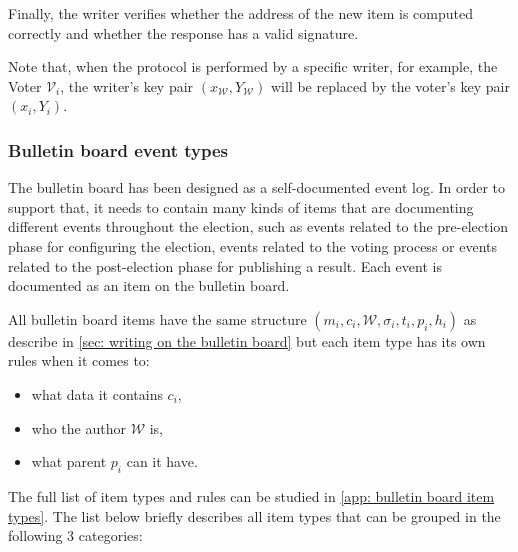 Finally, the writer verifies whether the address of the new item is computed correctly and whether the response has a valid signature.

Note that, when the protocol is performed by a specific writer, for example, the Voter $\mathcal{V}_i$, the writer's key pair $(x_\mathcal{W}, Y_\mathcal{W})$ will be replaced by the voter's key pair $(x_i, Y_i)$.


\subsubsection{Bulletin board event types} \label{sec: bulletin board event types}
The bulletin board has been designed as a self-documented event log. In order to support that, it needs to contain many kinds of items that are documenting different events throughout the election, such as events related to the pre-election phase for configuring the election, events related to the voting process or events related to the post-election phase for publishing a result. Each event is documented as an item on the bulletin board.

All bulletin board items have the same structure $(m_i, c_i, \mathcal{W}, \sigma_i, t_i, p_i, h_i)$ as describe in \cref{sec: writing on the bulletin board} but each item type has its own rules when it comes to:
\begin{itemize}
    \item what data it contains $c_i$,
    \item who the author $\mathcal{W}$ is,
    \item what parent $p_i$ can it have.
\end{itemize}

The full list of item types and rules can be studied in \cref{app: bulletin board item types}. The list below briefly describes all item types that can be grouped in the following 3 categories:

